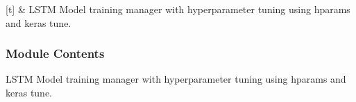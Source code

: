 \documentclass[letterpaper,10pt,english]{sphinxmanual}
\begin{document}
\begin{savenotes}\sphinxattablestart
\sphinxthistablewithglobalstyle
\sphinxthistablewithnovlinesstyle
\centering
\begin{tabulary}{\linewidth}[t]{}
\sphinxtoprule
\sphinxtableatstartofbodyhook
\sphinxAtStartPar
{\hyperref[\detokenize{autoapi/src/LSTMTrainer/index:src.LSTMTrainer.LSTMTrainer}]{}}
&
\sphinxAtStartPar
LSTM Model training manager with hyperparameter tuning using hparams and keras tune.
\\
\sphinxbottomrule
\end{tabulary}
\sphinxtableafterendhook\par
\sphinxattableend\end{savenotes}


\subsubsection{Module Contents}
\label{\detokenize{autoapi/src/LSTMTrainer/index:module-contents}}

\begin{fulllineitems}
\label{\detokenize{autoapi/src/LSTMTrainer/index:src.LSTMTrainer.LSTMTrainer}}
\pysigstartsignatures
\pysiglinewithargsret
{}
{\sphinxparamcomma {}}
{}
\pysigstopsignatures
\end{fulllineitems}


\sphinxAtStartPar
LSTM Model training manager with hyperparameter tuning using hparams and keras tune.

\begin{fulllineitems}
\label{\detokenize{autoapi/src/LSTMTrainer/index:src.LSTMTrainer.__interval}}
\pysigstartsignatures
\pysigline
{}
\pysigstopsignatures
\end{fulllineitems}
\end{document}
